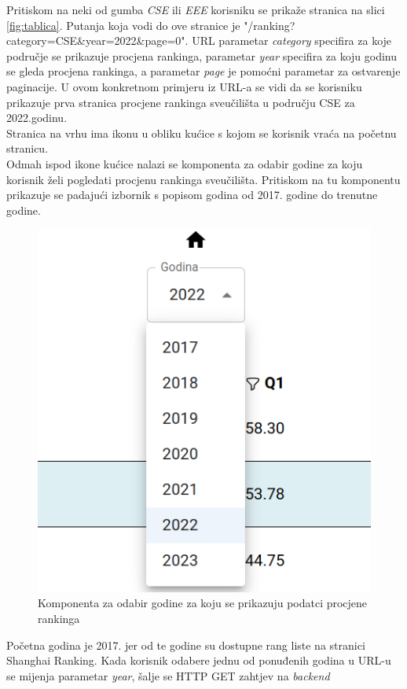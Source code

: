\documentclass[times, utf8, zavrsni]{fer}
\begin{document}
Pritiskom na neki od gumba \emph{CSE} ili \emph{EEE} korisniku se prikaže stranica na slici \ref{fig:tablica}. Putanja koja vodi do ove stranice 
je "/ranking?category=CSE\&year=2022\&page=0".
URL parametar \emph{category} specifira za koje područje se prikazuje procjena rankinga, parametar \emph{year} specifira 
za koju godinu se gleda procjena rankinga, a parametar \emph{page} je pomoćni parametar za ostvarenje paginacije.  
U ovom konkretnom primjeru iz URL-a se vidi da se korisniku prikazuje prva stranica procjene rankinga sveučilišta u području CSE za 2022.godinu.
\\Stranica na vrhu ima ikonu u obliku kućice s kojom se korisnik vraća na početnu stranicu. \\Odmah ispod ikone kućice nalazi se komponenta
za odabir godine za koju korisnik želi pogledati procjenu rankinga sveučilišta. Pritiskom na tu komponentu prikazuje se padajući izbornik 
s popisom godina od 2017. godine do trenutne godine. 
\begin{figure}[htb]
    \centering
       \includegraphics[scale=0.24]{select.png} 
       \caption{Komponenta za odabir godine za koju se prikazuju podatci procjene rankinga}
       \label{fig:select}
       \end{figure}
Početna godina je 2017. jer od te godine su dostupne rang liste na stranici 
Shanghai Ranking. Kada korisnik odabere jednu od ponuđenih godina u URL-u se mijenja parametar \emph{year}, šalje se HTTP GET zahtjev na \emph{backend}
\end{document}
